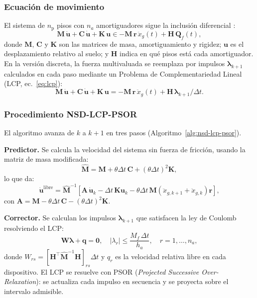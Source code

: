 \documentclass[preprint,12pt,authoryear]{elsarticle}
\newcommand{\np}{n_{\mathrm{p}}}
\newcommand{\Mf}{M_{\!f}}
\newcommand{\ha}{h_a}
\begin{document}
\subsubsection*{Ecuación de movimiento}

El sistema de $\np$ pisos con $n_a$ amortiguadores sigue la inclusión diferencial
\citep{Namorado2024}:
\begin{equation}
    \bm{M}\,\ddot{\bm{u}} + \bm{C}\,\dot{\bm{u}} + \bm{K}\,\bm{u}
    \in -\bm{M}\,\bm{r}\,\ddot{x}_g(t) + \bm{H}\,\bm{Q}_f(t),
    \label{eq:eom}
\end{equation}
donde $\bm{M}$, $\bm{C}$ y $\bm{K}$ son las matrices de masa, amortiguamiento
y rigidez; $\bm{u}$ es el desplazamiento relativo al suelo; y $\bm{H}$ indica
en qué pisos está cada amortiguador. En la versión discreta, la fuerza
multivaluada se reemplaza por impulsos $\bm{\lambda}_{k+1}$ calculados en cada
paso mediante un Problema de Complementariedad Lineal (LCP, ec.~\ref{eq:lcp}):
\begin{equation}
    \bm{M}\,\ddot{\bm{u}} + \bm{C}\,\dot{\bm{u}} + \bm{K}\,\bm{u}
    = -\bm{M}\,\bm{r}\,\ddot{x}_g(t) + \bm{H}\,\bm{\lambda}_{k+1}/\Delta t.
    \label{eq:eom_disc}
\end{equation}

\subsubsection*{Procedimiento NSD-LCP-PSOR}

El algoritmo avanza de $k$ a $k+1$ en tres pasos (Algoritmo~\ref{alg:nsd-lcp-psor}).

\textbf{Predictor.} Se calcula la velocidad del sistema sin fuerza de fricción,
usando la matriz de masa modificada:
\begin{equation}
    \hat{\bm{M}} = \bm{M}
                  + \theta\Delta t\,\bm{C}
                  + (\theta\Delta t)^{2}\bm{K},
    \label{eq:Mhat}
\end{equation}
lo que da:
\begin{equation}
    \dot{\bm{u}}^{\mathrm{libre}} = \hat{\bm{M}}^{-1}
    \!\left[
        \bm{A}\,\dot{\bm{u}}_k
        - \Delta t\,\bm{K}\bm{u}_k
        - \theta\Delta t\,\bm{M}\!\left(\ddot{x}_{g,k+1}+\ddot{x}_{g,k}\right)\bm{r}
    \right],
    \label{eq:vfree}
\end{equation}
con $\bm{A} = \bm{M} - \theta\Delta t\,\bm{C} - (\theta\Delta t)^{2}\bm{K}$.

\textbf{Corrector.} Se calculan los impulsos $\bm{\lambda}_{k+1}$ que satisfacen
la ley de Coulomb resolviendo el LCP:
\begin{equation}
    \bm{W}\bm{\lambda} + \bm{q} = \bm{0},
    \quad |\lambda_r| \leq \frac{\Mf\,\Delta t}{\ha},
    \quad r = 1,\ldots,n_a,
    \label{eq:lcp}
\end{equation}
donde $W_{rs} = [\bm{H}^{\top}\hat{\bm{M}}^{-1}\bm{H}]_{rs}\Delta t$ y
$q_r$ es la velocidad relativa libre en cada dispositivo. El LCP se resuelve
con PSOR (\textit{Projected Successive Over-Relaxation}): se actualiza cada
impulso en secuencia y se proyecta sobre el intervalo admisible.
\end{document}
